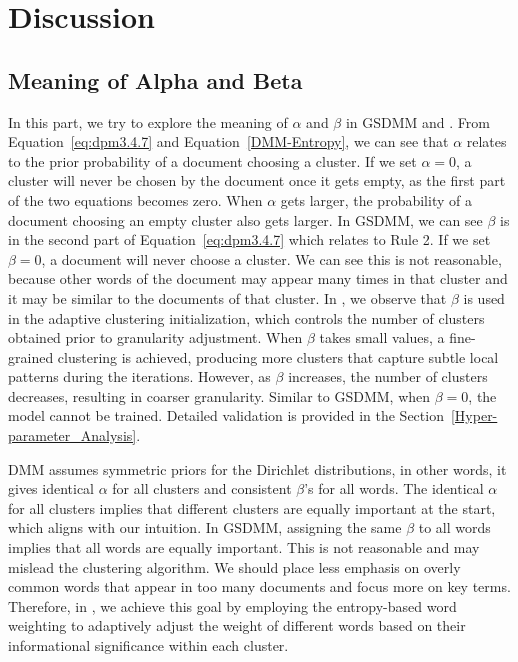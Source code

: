\section{Discussion}  \label{Discussion}
\subsection{Meaning of Alpha and Beta} \label{sec:disAlpahAndBeta}
In this part, we try to explore the meaning of $\alpha$ and $\beta$ in GSDMM and \sysname{}. From Equation~\eqref{eq:dpm3.4.7} and Equation~\eqref{DMM-Entropy}, we can see that $\alpha$ relates to the prior probability of a document choosing a cluster. If we set $\alpha=0$, a cluster will never be chosen by the document once it gets empty, as the first part of the two equations becomes zero. When $\alpha$ gets larger, the probability of a document choosing an empty cluster also gets larger.
In GSDMM, we can see $\beta$ is in the second part of Equation~\eqref{eq:dpm3.4.7} which relates to Rule 2. If we set $\beta=0$, a document will never choose a cluster. We can see this is not reasonable, because other words of the document may appear many times in that cluster and it may be similar to the documents of that cluster.
In \sysname{}, we observe that $\beta$ is used in the adaptive clustering initialization, which controls the number of clusters obtained prior to granularity adjustment. When $\beta$ takes small values, a fine-grained clustering is achieved, producing more clusters that capture subtle local patterns during the iterations. However, as $\beta$ increases, the number of clusters decreases, resulting in coarser granularity. Similar to GSDMM, when $\beta=0$, the model cannot be trained. Detailed validation is provided in the Section~\ref{Hyper-parameter_Analysis}.

DMM assumes symmetric priors for the Dirichlet distributions, in other words, it gives identical $\alpha$ for all clusters and consistent $\beta$'s for all words. The identical $\alpha$ for all clusters implies that different clusters are equally important at the start, which aligns with our intuition. 
In GSDMM, assigning the same $\beta$ to all words implies that all words are equally important. This is not reasonable and may mislead the clustering algorithm. We should place less emphasis on overly common words that appear in too many documents and focus more on key terms. Therefore, in \sysname{}, we achieve this goal by employing the entropy-based word weighting to adaptively adjust the weight of different words based on their informational significance within each cluster.

